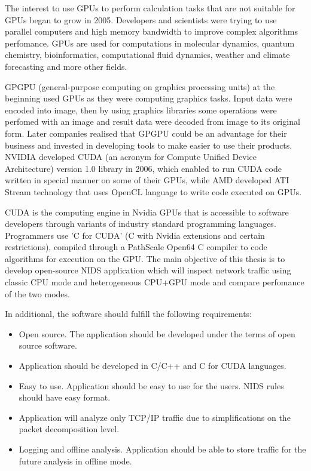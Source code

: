 \documentclass[thesis=M,english]{FITthesis}[2011/07/15]
\begin{document}
The interest to use GPUs to perform calculation tasks that are not suitable for GPUs began to grow in 2005. Developers and scientists were trying to use parallel computers and high memory bandwidth to improve complex algorithms perfomance. GPUs are used for computations in molecular dynamics, quantum chemistry, bioinformatics, computational fluid dynamics, weather and climate forecasting and more other fields.

GPGPU (general-purpose computing on graphics processing units) at the beginning used GPUs as they were computing graphics tasks. Input data were encoded into image, then by using graphics libraries some operations were perfomed with an image and result data were decoded from image to its original form. Later companies realised that GPGPU could be an advantage for their business and invested in developing tools to make easier to use their products. NVIDIA developed CUDA (an acronym for Compute Unified Device Architecture) version 1.0 library in 2006, which enabled to run CUDA code written in special manner on some of their GPUs, while AMD developed ATI Stream technology that uses OpenCL language to write code executed on GPUs.

CUDA is the computing engine in Nvidia GPUs that is accessible to software developers through variants of industry standard programming languages. Programmers use 'C for CUDA' (C with Nvidia extensions and certain restrictions), compiled through a PathScale Open64 C compiler to code algorithms for execution on the GPU.
The main objective of this thesis is to develop open-source NIDS application which will inspect network traffic using classic CPU mode and heterogeneous CPU+GPU mode and compare perfomance of the two modes. 

In additional, the software should fulfill the following requirements:
\begin{itemize}
\item Open source. The application should be developed under the terms of open source software.
\item Application should be developed in C/C++ and C for CUDA languages.
\item Easy to use. Application should be easy to use for the users. NIDS rules should have easy format.
\item Application will analyze only TCP/IP traffic due to simplifications on the packet decomposition level.
\item Logging and offline analysis. Application should be able to store traffic for the future analysis in offline mode.
\end{itemize}
\end{document}
